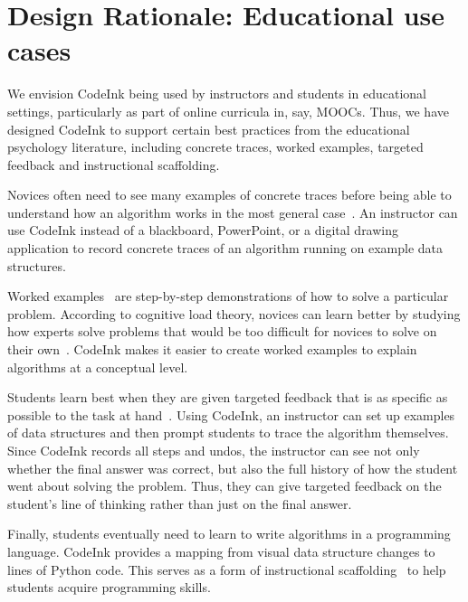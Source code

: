 \section{Design Rationale: Educational use cases}

We envision CodeInk being used by instructors and students in
educational settings, particularly as part of online curricula in, say,
MOOCs. Thus, we have designed CodeInk to support certain best practices
from the educational psychology literature, including concrete traces,
worked examples, targeted feedback and instructional scaffolding.

Novices often need to see many examples of concrete traces before being able to
understand how an algorithm works in the most general case~\cite{Detienne90}. An
instructor can use CodeInk instead of a blackboard, PowerPoint, or a digital
drawing application to record concrete traces of an algorithm running on example
data structures.


Worked examples~\cite{Sweller1985} are step-by-step demonstrations of
how to solve a particular problem. According to cognitive load theory,
novices can learn better by studying how experts solve problems that
would be too difficult for novices to solve on their
own~\cite{Linn1992}. CodeInk makes it easier to create worked examples
to explain algorithms at a conceptual level.

Students learn best when they are given targeted feedback that is
as specific as possible to the task at hand~\cite{Balzer1989}. Using
CodeInk, an instructor can set up examples of data structures and then
prompt students to trace the algorithm themselves. Since CodeInk records
all steps and undos, the instructor can see not only whether the final
answer was correct, but also the full history of how the student went
about solving the problem. Thus, they can give targeted feedback on the
student's line of thinking rather than just on the final answer.

Finally, students eventually need to learn to write algorithms in a programming
language. CodeInk provides a mapping from visual data structure changes to lines
of Python code. This serves as a form of instructional
scaffolding~\cite{Pea2004} to help students acquire programming skills.



